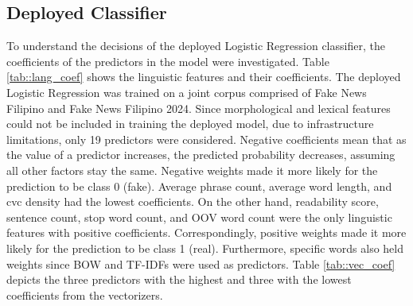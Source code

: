 \subsection{Deployed Classifier}
\label{subsec::deployed-class}
To understand the decisions of the deployed Logistic Regression classifier, the coefficients of the predictors in the model were investigated. Table \ref{tab::lang_coef} shows the linguistic features and their coefficients. The deployed Logistic Regression was trained on a joint corpus comprised of Fake News Filipino and Fake News Filipino 2024. Since morphological and lexical features could not be included in training the deployed model, due to infrastructure limitations, only 19 predictors were considered. Negative coefficients mean that as the value of a predictor increases, the predicted probability decreases, assuming all other factors stay the same. Negative weights made it more likely for the prediction to be class 0 (fake). Average phrase count, average word length, and cvc density had the lowest coefficients. On the other hand, readability score, sentence count, stop word count, and OOV word count were the only linguistic features with positive coefficients. Correspondingly, positive weights made it more likely for the prediction to be class 1 (real). Furthermore, specific words also held weights since BOW and TF-IDFs were used as predictors. Table \ref{tab::vec_coef} depicts the three predictors with the highest and three with the lowest coefficients from the vectorizers. 

